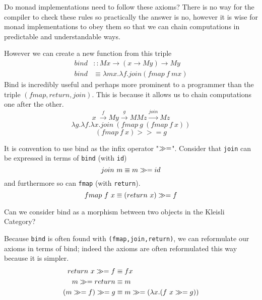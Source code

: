 Do monad implementations need to follow these axioms?
There is no way for the compiler to check these rules so practically the answer is no,
however it is wise for monad implementations to obey them so that
we can chain computations in predictable and understandable ways.

However we can create a new function from this triple
\begin{align}
    bind &:: M x \rightarrow (x \rightarrow M y) \rightarrow M y \\
    bind &\equiv \lambda mx. \lambda f. join(fmap\ f\ mx)
\end{align}
Bind is incredibly useful and perhaps more prominent
to a programmer than the triple $(fmap,return,join)$.
This is because it allows us to chain computations
one after the other.
\begin{equation}
    x\
    \stackrel{f}{\rightarrow} My
    \stackrel{g}{\rightarrow} MMz
    \stackrel{join}{\rightarrow} Mz
\end{equation}
\begin{equation}
    \lambda g.
    \lambda f.
    \lambda x.
    join\ (fmap\ g\ (fmap\ f\ x))
\end{equation}
\begin{equation}
    (fmap\ f\ x) >>= g
\end{equation}

It is convention to use bind as the infix operator "$\gg=$".
Consider that \texttt{join} can be expressed in terms of \texttt{bind} (with \texttt{id})
\begin{equation}
    join\ m \equiv m \gg= id
\end{equation}
and furthermore so can \texttt{fmap} (with \texttt{return}).
\begin{equation}
    fmap\ f\ x \equiv (return\ x) \gg= f
\end{equation}

Can we consider bind as a morphism between two objects in the Kleisli Category?

Because \texttt{bind} is often found with \texttt{(fmap,join,return)},
we can reformulate our axioms in terms of bind;
indeed the axioms are often reformulated this way because it is simpler.
\begin{align}
    return\ x \gg= f &\equiv f x \\
    m \gg= return &\equiv m \\
    (m \gg= f) \gg= g &\equiv m \gg= (\lambda x.(f\ x \gg= g))
\end{align}

